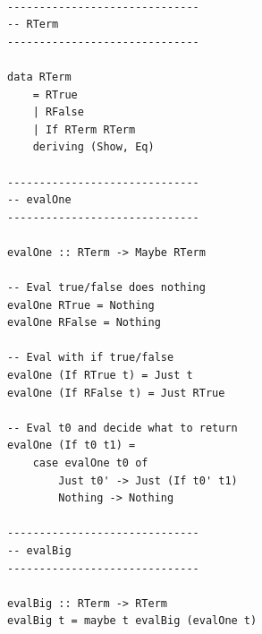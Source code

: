 \documentclass[letterpaper]{article}
\theoremstyle{plain}
\theoremstyle{definition}
\theoremstyle{remark}
\begin{document}
\begin{verbatim}

------------------------------
-- RTerm
------------------------------

data RTerm
    = RTrue 
    | RFalse
    | If RTerm RTerm
    deriving (Show, Eq)

------------------------------
-- evalOne
------------------------------

evalOne :: RTerm -> Maybe RTerm

-- Eval true/false does nothing
evalOne RTrue = Nothing
evalOne RFalse = Nothing

-- Eval with if true/false
evalOne (If RTrue t) = Just t
evalOne (If RFalse t) = Just RTrue

-- Eval t0 and decide what to return
evalOne (If t0 t1) = 
    case evalOne t0 of
        Just t0' -> Just (If t0' t1)
        Nothing -> Nothing

------------------------------
-- evalBig
------------------------------

evalBig :: RTerm -> RTerm 
evalBig t = maybe t evalBig (evalOne t)
\end{verbatim}
\end{document}

